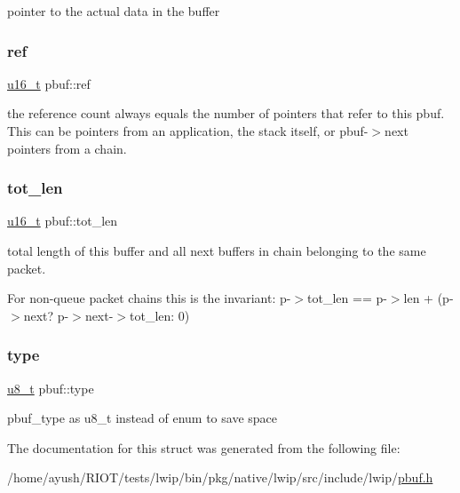 pointer to the actual data in the buffer \mbox{\label{structpbuf_a18e2c02942feb1baa3756fcd585b6731}} 
\subsubsection{\texorpdfstring{ref}{ref}}
{\footnotesize\ttfamily \hyperlink{group__compiler__abstraction_ga77570ac4fcab86864fa1916e55676da2}{u16\+\_\+t} pbuf\+::ref}

the reference count always equals the number of pointers that refer to this pbuf. This can be pointers from an application, the stack itself, or pbuf-\/$>$next pointers from a chain. \mbox{\label{structpbuf_a5259e7ec29bab9c0999b64f2e86b411f}} 
\subsubsection{\texorpdfstring{tot\+\_\+len}{tot\_len}}
{\footnotesize\ttfamily \hyperlink{group__compiler__abstraction_ga77570ac4fcab86864fa1916e55676da2}{u16\+\_\+t} pbuf\+::tot\+\_\+len}

total length of this buffer and all next buffers in chain belonging to the same packet.

For non-\/queue packet chains this is the invariant\+: p-\/$>$tot\+\_\+len == p-\/$>$len + (p-\/$>$next? p-\/$>$next-\/$>$tot\+\_\+len\+: 0) \mbox{\label{structpbuf_afd7bff5210a022424caa97d2f25fe8e6}} 
\subsubsection{\texorpdfstring{type}{type}}
{\footnotesize\ttfamily \hyperlink{group__compiler__abstraction_ga4caecabca98b43919dd11be1c0d4cd8e}{u8\+\_\+t} pbuf\+::type}

pbuf\+\_\+type as u8\+\_\+t instead of enum to save space 

The documentation for this struct was generated from the following file\+:\begin{DoxyCompactItemize}
\item 
/home/ayush/\+R\+I\+O\+T/tests/lwip/bin/pkg/native/lwip/src/include/lwip/\hyperlink{native_2lwip_2src_2include_2lwip_2pbuf_8h}{pbuf.\+h}\end{DoxyCompactItemize}
